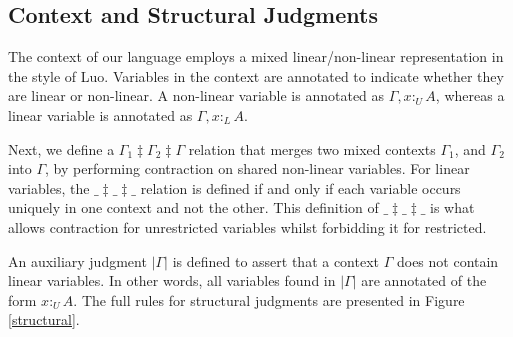 \documentclass[sigplan,screen,review,authordraft]{acmart}
\theoremstyle{definition}
\newcommand{\pure}[1]{|#1|}
\newcommand{\utype}{:_{\scriptscriptstyle U}}
\newcommand{\ltype}{:_{\scriptscriptstyle L}}
\newcommand{\mrg}[3]{#1\ddagger#2\ddagger#3}
\begin{document}
  \subsection{Context and Structural Judgments}
  The context of our language employs a mixed linear/non-linear representation in the style of Luo\cite{luo}. Variables in the context are annotated to indicate whether they are linear or non-linear. A non-linear variable is annotated as $\Gamma, x \utype A$, whereas a linear variable is annotated as $\Gamma, x \ltype A$. 
  
  Next, we define a $\mrg{\Gamma_1}{\Gamma_2}{\Gamma}$ relation that merges two mixed contexts $\Gamma_1$, and $\Gamma_2$ into $\Gamma$, by performing contraction on shared non-linear variables. For linear variables, the $\mrg{\_}{\_}{\_}$ relation is defined if and only if each variable occurs uniquely in one context and not the other. This definition of $\mrg{\_}{\_}{\_}$ is what allows contraction for unrestricted variables whilst forbidding it for restricted.

  An auxiliary judgment $\pure{\Gamma}$ is defined to assert that a context $\Gamma$ does not contain linear variables. In other words, all variables found in $\pure{\Gamma}$ are annotated of the form $x \utype A$. The full rules for structural judgments are presented in Figure \ref{structural}.
  
\end{document}
